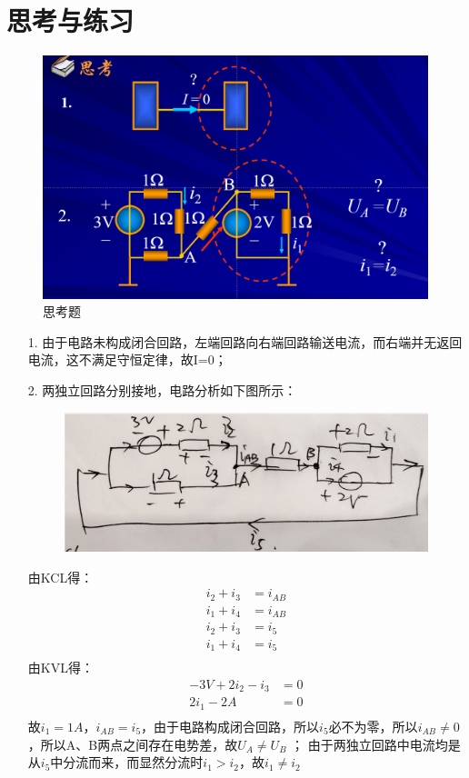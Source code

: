 \documentclass[11pt,a4paper,oneside]{book}
\begin{document}
\section{思考与练习}
\begin{figure}[H]
	\centering
	\includegraphics[width=0.7\linewidth]{screenshot128}
	\caption{思考题}
	\label{fig:screenshot128}
\end{figure}
\begin{enumerate}
	\item[1.] 由于电路未构成闭合回路，左端回路向右端回路输送电流，而右端并无返回电流，这不满足守恒定律，故I=0；
	\item[2.] 两独立回路分别接地，电路分析如下图所示：
	\begin{figure}[H]
		\centering
		\includegraphics[width=0.5\linewidth]{screenshot013}
		\caption{}
		\label{fig:screenshot013}
	\end{figure}
	由KCL得：
	\begin{equation}
		\begin{aligned}
			i_2+i_3&=i_{AB} \\
			i_1+i_4&=i_{AB} \\
			i_2+i_3&=i_5 \\
			i_1+i_4&=i_5 \\
		\end{aligned}
	\end{equation}
	由KVL得：
	\begin{equation}
		\begin{aligned}
			-3V+2i_2-i_3&=0 \\
			2i_1-2A&=0 \\
		\end{aligned}
	\end{equation}
故$i_1=1A$，$i_{AB}=i_5$，由于电路构成闭合回路，所以$i_5$必不为零，所以$i_{AB} \neq 0$，所以A、B两点之间存在电势差，故$U_A \neq U_B$ ；  
由于两独立回路中电流均是从$i_5$中分流而来，而显然分流时$i_1 >i_2$，故$i_1 \neq i_2$
\end{enumerate}
\end{document}
